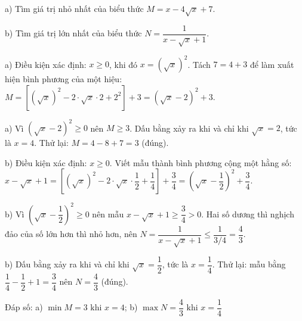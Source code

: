 \begin{problem}[9DS-CAN-047]
a) Tìm giá trị nhỏ nhất của biểu thức $M = x - 4\sqrt{x} + 7$.

b) Tìm giá trị lớn nhất của biểu thức $N = \dfrac{1}{x - \sqrt{x} + 1}$.

\begin{solution}
a) Điều kiện xác định: $x \geq 0$, khi đó $x = (\sqrt{x})^2$. Tách $7 = 4 + 3$ để làm xuất hiện bình phương của một hiệu: $M = \left[(\sqrt{x})^2 - 2 \cdot \sqrt{x} \cdot 2 + 2^2\right] + 3 = (\sqrt{x} - 2)^2 + 3$.

a) Vì $(\sqrt{x} - 2)^2 \geq 0$ nên $M \geq 3$. Dấu bằng xảy ra khi và chỉ khi $\sqrt{x} = 2$, tức là $x = 4$. Thử lại: $M = 4 - 8 + 7 = 3$ (đúng).

b) Điều kiện xác định: $x \geq 0$. Viết mẫu thành bình phương cộng một hằng số: $x - \sqrt{x} + 1 = \left[(\sqrt{x})^2 - 2 \cdot \sqrt{x} \cdot \dfrac{1}{2} + \dfrac{1}{4}\right] + \dfrac{3}{4} = \left(\sqrt{x} - \dfrac{1}{2}\right)^2 + \dfrac{3}{4}$.

b) Vì $\left(\sqrt{x} - \dfrac{1}{2}\right)^2 \geq 0$ nên mẫu $x - \sqrt{x} + 1 \geq \dfrac{3}{4} > 0$. Hai số dương thì nghịch đảo của số lớn hơn thì nhỏ hơn, nên $N = \dfrac{1}{x - \sqrt{x} + 1} \leq \dfrac{1}{3/4} = \dfrac{4}{3}$.

b) Dấu bằng xảy ra khi và chỉ khi $\sqrt{x} = \dfrac{1}{2}$, tức là $x = \dfrac{1}{4}$. Thử lại: mẫu bằng $\dfrac{1}{4} - \dfrac{1}{2} + 1 = \dfrac{3}{4}$ nên $N = \dfrac{4}{3}$ (đúng).

Đáp số: a) $\boxed{\min M = 3 \text{ khi } x = 4}$; b) $\boxed{\max N = \dfrac{4}{3} \text{ khi } x = \dfrac{1}{4}}$
\end{solution}
\end{problem}

